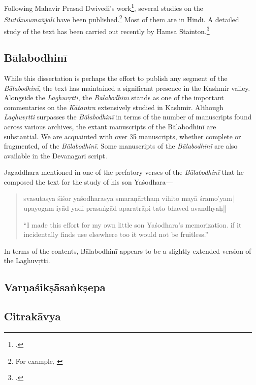 Following Mahavir Prasad Dwivedi's work\footcite{Dvivedi1928}, several studies on the \emph{Stutikusumāñjali} have been published.\footnote{For example, \cite{Tirtha1989}} Most of them are in Hindi. A detailed study of the text has been carried out recently by Hamsa Stainton.\footcites{Stainton2016}{Stainton2019}


\subsection{Bālabodhinī}

While this dissertation is perhaps the effort to publish any segment of the \emph{Bālabodhinī}, the text has maintained a significant presence in the Kashmir valley. Alongside the \emph{Laghuvṛtti}, the \emph{Bālabodhinī} stands as one of the important commentaries on the \emph{Kātantra} extensively studied in Kashmir. Although \emph{Laghuvṛtti} surpasses the \emph{Bālabodhinī} in terms of the number of manuscripts found across various archives, the extant manuscripts of the Bālabodhinī are substantial. We are acquainted with over 35 manuscripts, whether complete or fragmented, of the \emph{Bālabodhinī}. Some manuscripts of the \emph{Bālabodhinī} are also available in the Devanagari script.  

Jagaddhara mentioned in one of the prefatory verses of the \emph{Bālabodhinī} that he composed the text for the study of his son Yaśodhara—

\begin{quote}
	
\textsanskrit{svasutasya śiśor yaśodharasya smaraṇārthaṃ vihito mayā śramo'yam|\\
	upayogam iyād yadi prasaṅgād aparatrāpi tato bhaved avandhyaḥ||}

“I made this effort for my own little son Yaśodhara's memorization. if it incidentally finds use elsewhere too it would not be fruitless.”
	
\end{quote}


In terms of the contents, Bālabodhinī appears to be a slightly extended version of the Laghuvṛtti. 


\subsection{Varṇaśikṣāsaṅkṣepa}

\subsection{Citrakāvya}

